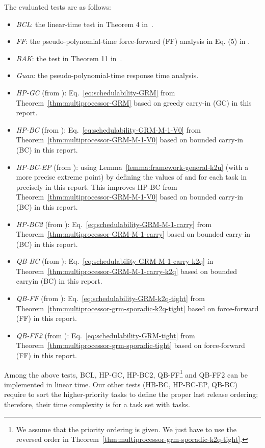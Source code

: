 \documentclass[10pt,conference]{IEEEtran}
\newcommand{\frameworkkq}[1]{}
\newcommand{\frameworkku}[1]{}
\begin{document}
The evaluated tests are as follows:
\begin{itemize}
\item \emph{BCL}: the linear-time test in Theorem 4 in~\cite{bertogna2006new}.
\item \emph{FF}: the pseudo-polynomial-time force-forward (FF) analysis in Eq. (5) in \cite{DBLP:journals/rts/BaruahBMS10}.
\item \emph{BAK}: the  test in Theorem 11 in~\cite{baker2006analysis}.
\item \emph{Guan}: the pseudo-polynomial-time response time analysis\cite{DBLP:conf/rtss/GuanSYY09}.
\item \emph{HP-GC} (from \frameworkku{}): Eq.~\eqref{eq:schedulability-GRM} from Theorem~\ref{thm:multiprocessor-GRM} based on greedy carry-in (GC) in this report.
\item \emph{HP-BC} (from \frameworkku{}): Eq.~\eqref{eq:schedulability-GRM-M-1-V0} from Theorem~\ref{thm:multiprocessor-GRM-M-1-V0} based on bounded carry-in (BC) in this report. 
\item \emph{HP-BC-EP} (from \frameworkku{}):  using Lemma~\ref{lemma:framework-general-k2u}
  (with a more precise extreme point) by defining the values of
   and  for each task  in 
  precisely in this report. This improves HP-BC from Theorem~\ref{thm:multiprocessor-GRM-M-1-V0} based on bounded carry-in (BC) in this report. 
\item \emph{HP-BC2} (from \frameworkku{}): Eq.~\eqref{eq:schedulability-GRM-M-1-carry} from Theorem~\ref{thm:multiprocessor-GRM-M-1-carry} based on bounded carry-in (BC) in this report.
\item \emph{QB-BC} (from \frameworkkq{}): Eq.~\eqref{eq:schedulability-GRM-M-1-carry-k2q} in Theorem~\ref{thm:multiprocessor-GRM-M-1-carry-k2q} based on bounded carryin (BC) in this report.
\item \emph{QB-FF} (from \frameworkkq{}): Eq.~\eqref{eq:schedulability-GRM-k2q-tight} from Theorem~\ref{thm:multiprocessor-grm-sporadic-k2q-tight} based on force-forward (FF) in this report.
\item \emph{QB-FF2} (from \frameworkkq{}): Eq.~\eqref{eq:schedulability-GRM-tight} from Theorem~\ref{thm:multiprocessor-grm-sporadic-tight} based on force-forward (FF) in this report.
\end{itemize}

Among the above tests,  BCL, HP-GC, HP-BC2, QB-FF\footnote{We assume that the priority ordering is given. We just have to use the reversed order in Theorem~\ref{thm:multiprocessor-grm-sporadic-k2q-tight}.} and QB-FF2 can be implemented in linear time. Our other tests (HB-BC, HP-BC-EP, QB-BC) require to sort the higher-priority tasks to define the proper last release ordering; therefore, their time complexity is  for a task set with  tasks.
\end{document}
